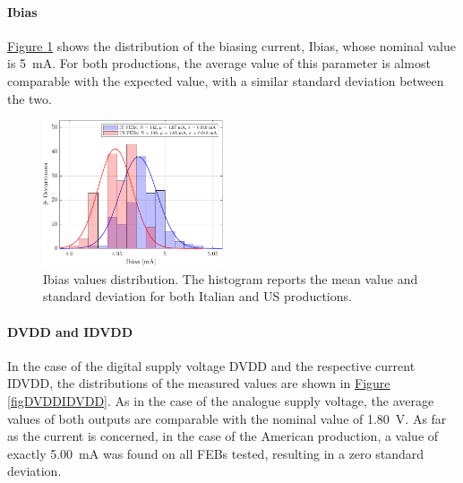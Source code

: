 \paragraph{Ibias} \hyperref[figFEBIbias]{Figure \ref{figFEBIbias}} shows the distribution of the biasing current, Ibias, whose nominal value is \SI{5}{\milli\ampere}. For both productions, the average value of this parameter is almost comparable with the expected value, with a similar standard deviation between the two.

\begin{figure}[ht]
    \centering
    \includegraphics[width=0.475\textwidth]{Images/chap2/results/Ibias.pdf}
    \caption{Ibias values distribution. The histogram reports the mean value and standard deviation for both Italian and US productions.}
    \label{figFEBIbias}
\end{figure}

\paragraph{DVDD and IDVDD} In the case of the digital supply voltage DVDD and the respective current IDVDD, the distributions of the measured values are shown in \hyperref[figDVDDIDVDD]{Figure \ref{figDVDDIDVDD}}. As in the case of the analogue supply voltage, the average values of both outputs are comparable with the nominal value of \SI{1.80}{\volt}. As far as the current is concerned, in the case of the American production, a value of exactly \SI{5.00}{\milli\ampere} was found on all FEBs tested, resulting in a zero standard deviation.

